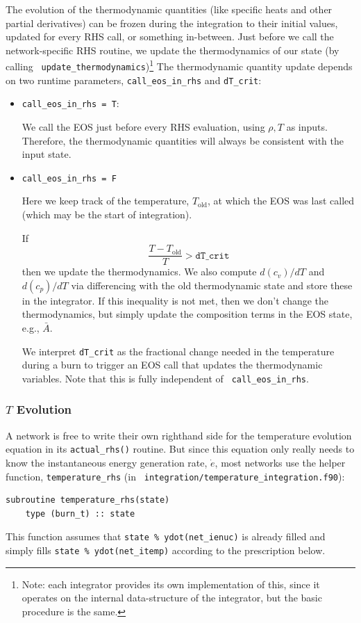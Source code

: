 The evolution of the thermodynamic quantities (like specific heats and
other partial derivatives) can be frozen during the integration to
their initial values, updated for every RHS call, or something
in-between.  Just before we call the network-specific RHS routine, we
update the thermodynamics of our state (by calling {\tt
  update\_thermodynamics})\footnote{Note: each integrator provides its
  own implementation of this, since it operates on the internal
  data-structure of the integrator, but the basic procedure is the
  same.}  The thermodynamic quantity update depends on two runtime
parameters, {\tt call\_eos\_in\_rhs} and {\tt dT\_crit}:
\begin{itemize}
\item {\tt call\_eos\_in\_rhs = T}:

  We call the EOS just before every RHS evaluation, using $\rho, T$ as
  inputs.  Therefore, the thermodynamic quantities will always be
  consistent with the input state.

\item {\tt call\_eos\_in\_rhs = F}

  Here we keep track of the temperature, $T_\mathrm{old}$, at
  which the EOS was last called (which may be the start of integration).

  If
  \begin{equation}
    \frac{T - T_\mathrm{old}}{T} > \mathtt{dT\_crit}
    \end{equation}
  then we update the thermodynamics.  We also compute $d(c_v)/dT$ and
  $d(c_p)/dT$ via differencing with the old thermodynamic state and
  store these in the integrator.  If this inequality is not met, then
  we don't change the thermodynamics, but simply update the
  composition terms in the EOS state, e.g., $\bar{A}$.

We interpret {\tt dT\_crit} as the fractional change needed in the
temperature during a burn to trigger an EOS call that updates the
thermodynamic variables.  Note that this is fully independent of {\tt
  call\_eos\_in\_rhs}.

\end{itemize}



\subsubsection{$T$ Evolution}

A network is free to write their own righthand side for the
temperature evolution equation in its {\tt actual\_rhs()} routine.
But since this equation only really needs to know the instantaneous
energy generation rate, $\dot{e}$, most networks use the helper
function, {\tt temperature\_rhs} (in {\tt
  integration/temperature\_integration.f90}):
\begin{lstlisting}[language={[95]fortran}]
  subroutine temperature_rhs(state)
    type (burn_t) :: state
\end{lstlisting}
This function assumes that {\tt state \% ydot(net\_ienuc)} is already
filled and simply fills {\tt state \% ydot(net\_itemp)} according to
the prescription below.


